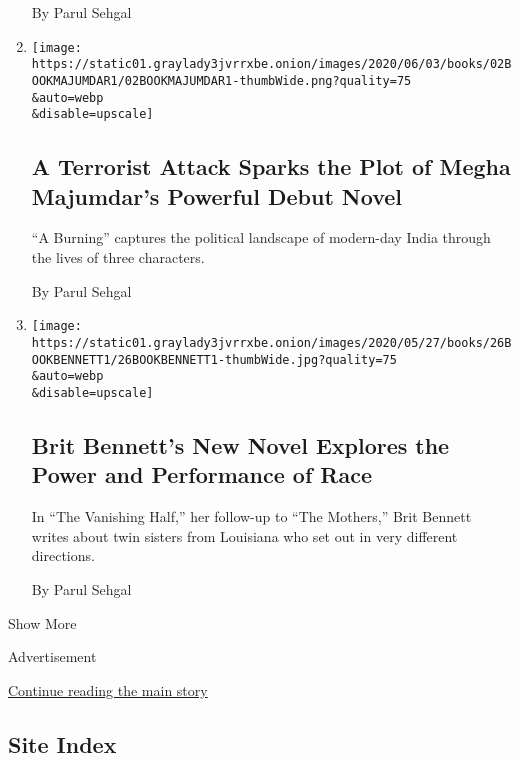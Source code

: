 \begin{enumerate}
  By Parul Sehgal
\item
  \href{/2020/06/02/books/review-burning-megha-majumdar.html}{}

  \texttt{[image: https://static01.graylady3jvrrxbe.onion/images/2020/06/03/books/02BOOKMAJUMDAR1/02BOOKMAJUMDAR1-thumbWide.png?quality=75\\\&auto=webp\\\&disable=upscale]}

  \hypertarget{a-terrorist-attack-sparks-the-plot-of-megha-majumdars-powerful-debut-novel}{%
  \subsection{A Terrorist Attack Sparks the Plot of Megha Majumdar's
  Powerful Debut
  Novel}\label{a-terrorist-attack-sparks-the-plot-of-megha-majumdars-powerful-debut-novel}}

  ``A Burning'' captures the political landscape of modern-day India
  through the lives of three characters.

  By Parul Sehgal
\item
  \href{/2020/05/26/books/review-vanishing-half-brit-bennett.html}{}

  \texttt{[image: https://static01.graylady3jvrrxbe.onion/images/2020/05/27/books/26BOOKBENNETT1/26BOOKBENNETT1-thumbWide.jpg?quality=75\\\&auto=webp\\\&disable=upscale]}

  \hypertarget{brit-bennetts-new-novel-explores-the-power-and-performance-of-race}{%
  \subsection{Brit Bennett's New Novel Explores the Power and
  Performance of
  Race}\label{brit-bennetts-new-novel-explores-the-power-and-performance-of-race}}

  In ``The Vanishing Half,'' her follow-up to ``The Mothers,'' Brit
  Bennett writes about twin sisters from Louisiana who set out in very
  different directions.

  By Parul Sehgal
\end{enumerate}

Show More

Advertisement

\protect\hyperlink{after-mid2}{Continue reading the main story}

\hypertarget{site-index}{%
\subsection{Site Index}\label{site-index}}

